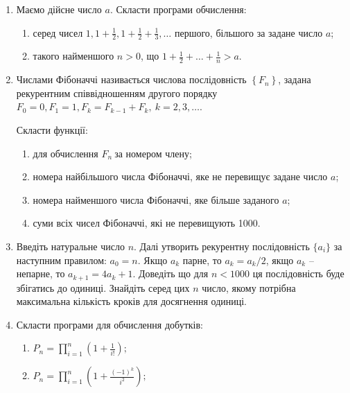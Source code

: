 \documentclass[a5paper,titlepage,openany,twoside,
]
{book_unv}%
\makeatletter
\newcommand{\xslalph}[1]{\expandafter\@xslalph\csname c@#1\endcsname}
\newcommand{\@xslalph}[1]{%
    \ifcase#1\or а\or б\or в\or г\or д\or e\or є\or ж\or з\or i%
    \or й\or к\or л\or м\or н\or о\or п\or р\or с\or т%
    \or у\or ф\or х\or ц\or ч\or ш\or ю\or я\or аа\or бб\or вв%
    \else\@ctrerr\fi%
}
\makeatother
\begin{document}
\begin{enumerate}
\def\labelenumi{\arabic{enumi})}
\item
  Маємо дійсне число $a$. Скласти програми обчислення:
\begin{enumerate}[label=\xslalph*)]
\item серед чисел
\(1,1 + \frac{1}{2},1 + \frac{1}{2} + \frac{1}{3},\ldots\) першого,
більшого за задане число $a$;

\item такого найменшого $n>0$, що
\(1 + \frac{1}{2} + \ldots + \frac{1}{n} > a.\)

\end{enumerate}

\item
  Числами Фібоначчі називається числова послідовність
  \(\left\{ F_{n} \right\}\), задана рекурентним співвідношенням другого
  порядку
  \(F_{0} = 0,F_{1} = 1,F_{k} = F_{k - 1} + F_{k},\ k = 2,3,\ldots\).

Скласти функції:
\begin{enumerate}[label=\xslalph*)]
\item
для обчислення \(F_{n}\ \)за номером члену;
\item номера найбільшого числа Фібоначчі, яке не перевищує задане число
$a$;
\item номера найменшого числа Фібоначчі, яке більше заданого $a$;
\item суми всіх чисел Фібоначчі, які не перевищують 1000.

\end{enumerate}

\item
  Введіть натуральне число $n$. Далі утворить рекурентну послідовність
  \(\{a_{i}\}\) за наступним правилом: \(a_{0} = n\). Якщо \(a_{k}\) парне,
  то \(a_{k} = a_{k}/2\), якщо $a_k$ -- непарне, то \(a_{k + 1} = 4a_{k} + 1\). Доведіть
  що для $n<1000$ ця послідовність буде збігатись до
  одиниці. Знайдіть серед цих $n$ число, якому потрібна максимальна
  кількість кроків для досягнення одиниці.
\item
  Скласти програми для обчислення добутків:
\begin{enumerate}[label=\xslalph*)]
\item \(P_{n} = \prod\limits_{i = 1}^{n}\left( 1 + \frac{1}{i!} \right);\) 
\item
\(P_{n} = \prod\limits_{i = 1}^{n}\left(1 + \frac{(-1)^{k}}{i^{2}} \right);\)
\end{enumerate}


\end{enumerate}
\end{document}
